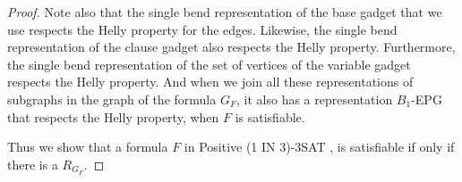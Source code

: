 \documentclass[a4paper,11pt]{article}
\begin{document}
\begin{proof}
Note also that the single bend representation of the base gadget that we use respects the Helly property for the edges. Likewise, the single bend  representation of the clause gadget also respects the Helly property. Furthermore, the single bend representation of the set of vertices of the variable gadget respects the Helly property. And when we join all these representations of subgraphs in the graph of the formula $ G_F $, it also has a representation $ B_1$-EPG that respects the Helly property, when $ F $ is satisfiable.




Thus we show that a formula $F$ in {\sc Positive (1 IN 3)-3SAT }, is satisfiable if only if there is a $R_{G_F}$.
\end{proof}





\end{document}
